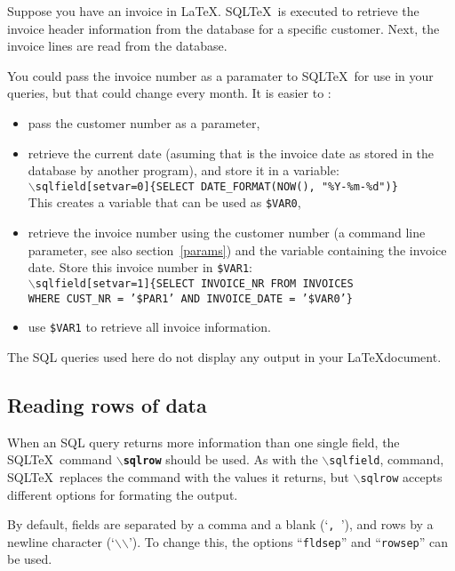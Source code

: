 \documentclass{article}
\newcommand{\bs}{\ensuremath{\backslash}}
\newcommand{\vs}{\vspace{3mm}}
\begin{document}
\vs

Suppose you have an invoice in \LaTeX. SQL\TeX\ is executed to retrieve the invoice header information
from the database for a specific customer. Next, the invoice lines are read from the database.

You could pass the invoice number as a paramater to SQL\TeX\ for use in your queries, but that could
change every month. It is easier to :\\
\begin{itemize}
\item pass the customer number as a parameter,
\item retrieve the current date (asuming that is the invoice date as stored in
the database by another program), and store it in a variable: \\
\texttt{\bs sqlfield[setvar=0]\{SELECT DATE\_FORMAT(NOW(), "\%Y-\%m-\%d")\}} \\
This creates a variable that can be used as \texttt{\$VAR0},
\item retrieve the invoice number using the customer number (a command line parameter,
see also section~\ref{params}) and the variable containing the invoice date.
Store this invoice number in \texttt{\$VAR1}: \\
\texttt{\bs sqlfield[setvar=1]\{SELECT INVOICE\_NR FROM INVOICES \\
WHERE CUST\_NR = '\$PAR1' AND INVOICE\_DATE = '\$VAR0'\}}
\item use \texttt{\$VAR1} to retrieve all invoice information.
\end{itemize}

\vs

The SQL queries used here do not display any output in your \LaTeX document.


\subsection{Reading rows of data}\label{sqlrow}

When an SQL query returns more information than one single field, the SQL\TeX\
command \texttt{\textbf{\bs sqlrow}} should be used. As with the \texttt{\bs sqlfield},
command, SQL\TeX\ replaces the command with the values it returns, but \texttt{\bs sqlrow}
accepts different options for formating the output.

\vs

By default, fields are separated by a comma and a blank (`\texttt{,~}'), and rows by 
a newline character (`\texttt{\bs\bs}'). To change this, the options ``\texttt{fldsep}''
and ``\texttt{rowsep}'' can be used.
\end{document}

